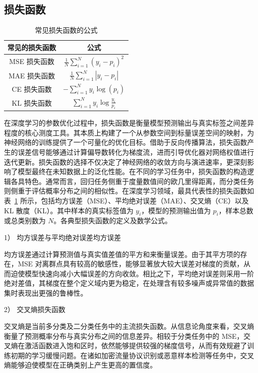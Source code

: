 \subsection{损失函数}
\begin{table}[h]
    \centering
    \renewcommand{\arraystretch}{3}
    \caption{常见损失函数的公式}
    \label{table:loss}
    \begin{tabular}{cc}
        \hline
        \textbf{常见的损失函数} & \textbf{公式} \\ \hline
        MSE 损失函数 & $\displaystyle \frac{1}{N} \sum_{i=1}^{N} (y_i - p_i)^2$ \\
        MAE 损失函数 & $\displaystyle \frac{1}{N} \sum_{i=1}^{N} |y_i - p_i|$ \\
        CE 损失函数 & $\displaystyle -\sum_{i=1}^{N} y_i \log(p_i)$ \\
        KL 损失函数 & $\displaystyle \sum_{i=1}^{N} y_i \log \frac{y_i}{p_i}$ \\ \hline
    \end{tabular}    
\end{table}
在深度学习的参数优化过程中，损失函数是衡量模型预测输出与真实标签之间差异程度的核心测度工具。其本质上构建了一个从参数空间到标量误差空间的映射，为神经网络的训练提供了一个可量化的优化目标。借助于反向传播算法，损失函数产生的误差信号能够通过计算偏导数转化为梯度流，进而引导优化器对网络权值进行迭代更新。损失函数的选择不仅决定了神经网络的收敛方向与演进速率，更深刻影响了模型最终在未知数据上的泛化性能。在不同的学习任务中，损失函数的构造逻辑各具特色。通常而言，回归任务侧重于度量数值间的欧几里得距离，而分类任务则侧重于评估概率分布之间的相似性。在深度学习领域，最具代表性的损失函数如表~\ref{table:loss} 所示，包括均方误差（MSE）、平均绝对误差（MAE）、交叉熵（CE）以及 KL 散度（KL）。其中样本的真实标签值为 $y_i$，模型的预测输出值为 $p_i$，样本总数或总类别数为 $N$。各典型损失函数的定义及数学公式。

1） 均方误差与平均绝对误差均方误差

均方误差通过计算预测值与真实值差值的平方和来衡量误差。由于其平方项的存在，MSE 对离群点具有较高的敏感性，能够显著放大较大误差对梯度的贡献，从而迫使模型快速向减小大幅误差的方向收敛。相比之下，平均绝对误差则采用一阶绝对差值，其梯度在整个定义域内更为稳定，在处理含有较多噪声或异常值的数据集时表现出更强的鲁棒性。

2） 交叉熵损失函数

交叉熵是当前多分类及二分类任务中的主流损失函数。从信息论角度来看，交叉熵衡量了预测概率分布与真实分布之间的信息差异。相较于分类任务中的 MSE，交叉熵在激活函数进入饱和区时，依然能够提供较强的梯度信号，从而有效规避了训练初期的学习缓慢问题。在诸如加密流量协议识别或恶意样本检测等任务中，交叉熵能够迫使模型在正确类别上产生更高的置信度。

